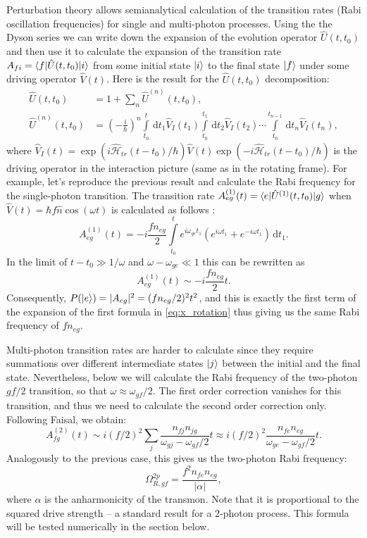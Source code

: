 \documentclass[12pt, twoside]{report}
\newcommand{\diff}{\,\mathrm{d}}
\DeclarePairedDelimiter\bra{\langle}{\rvert}
\DeclarePairedDelimiter\ket{\lvert}{\rangle}
\numberwithin{equation}{section}
\begin{document}
Perturbation theory allows semianalytical calculation of the transition rates	(Rabi oscillation frequencies) for single and multi-photon processes. Using the the Dyson series we can write down the expansion of the evolution operator $\hat U(t, t_0)$  and then use it to calculate the expansion of the transition rate $A_{fi} = \bra{f}\hat U(t, t_0)\ket{i}$ from some initial state $\ket{i}$ to the final state $\ket{f}$ under some driving operator $\hat V(t)$. Here is the result for the $\hat U(t, t_0)$ decomposition:\cite{faisal2013}
\begin{equation}
\begin{aligned}
\hat U(t, t_0) &= 1 + \sum_n \hat U^{(n)}(t, t_0),\\
\hat U^{(n)}(t, t_0) &= \left(-\frac{i}{\hbar}\right)^n\int\limits_{t_0}^t \diff t_1 \hat V_I(t_1)\int\limits_{t_0}^{t_1} \diff t_2 \hat V_I(t_2)\cdots\int\limits_{t_0}^{t_{n-1}} \diff t_n \hat V_I(t_n),
\end{aligned}
\end{equation}
where $\hat V_I(t) = \exp(i\mathcal{\hat H}_{tr}(t-t_0)/\hbar) \hat V(t) \exp(-i\mathcal{\hat H}_{tr}(t-t_0)/\hbar)$ is the driving operator in the interaction picture (same as in the rotating frame). For example, let's reproduce the previous result and calculate the Rabi frequency for the single-photon transition.  The transition rate $A^{(1)}_{eg}(t) = \bra{e}\hat U^{(1)}(t, t_0)\ket{g}$ when $\hat V(t) = \hbar f \hat n \cos(\omega t)$ is calculated as follows :
\begin{equation}
A^{(1)}_{eg}(t) = - i \frac{f n_{eg}}{2} \int\limits_{t_0}^t e^{i\omega_{ge} t_1} (e^{i\omega t_1}+e^{-i\omega t_1})\diff t_1.
\end{equation}
In the limit of ${t-t_0\gg1/\omega}$ and $\omega - \omega_{ge}\ll1$ this can be rewritten as
\[
A^{(1)}_{eg}(t) \sim - i \frac{f n_{eg}}{2} t.
\]
Consequently, $P(\ket{e}) = |A_{eg}|^2 = (f n_{eg}/2)^2t^2$, and this is exactly the first term of the expansion of the first formula in \eqref{eq:x_rotation} thus giving us the same Rabi frequency of $f n_{eg}$. 

Multi-photon transition rates are harder to calculate since they require summations over different intermediate states $\ket{j}$ between the initial and the final state. Nevertheless, below we will calculate the Rabi frequency of the two-photon $gf/2$ transition, so that $\omega \approx \omega_{gf}/2$. The first order correction vanishes for this transition, and thus we need to calculate the second order correction only. Following Faisal\cite{faisal2013}, we obtain:
\[
A^{(2)}_{fg}(t) \sim  i (f/2)^2 \sum_j \frac{n_{fj}n_{jg}}{\omega_{gj}-\omega_{gf}/2} t \approx  i (f/2)^2 \frac{n_{fe}n_{eg}}{\omega_{ge}-\omega_{gf}/2} t.
\]
Analogously to the previous case, this gives us the two-photon Rabi frequency: 
\begin{equation}
\Omega_{R, gf}^{2p} = \frac{f^2  n_{fe}n_{eg}}{|\alpha|} ,
\label{eq:rabi_2p}
\end{equation}
where $\alpha$ is the anharmonicity of the transmon. Note that it is proportional to the squared drive strength -- a standard result for a 2-photon process. This formula will be tested numerically in the section below.
 
\end{document}
